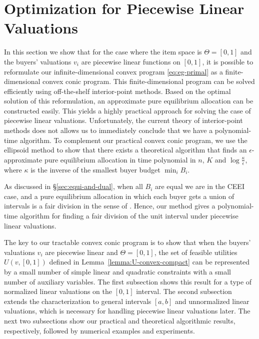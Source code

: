 \section{Optimization for Piecewise Linear Valuations} \label{sec:convex-opt-for-pwl}
In this section we show that for the case where the item space is $\Theta = [0,1]$ and the buyers' valuations $v_i$ are piecewise linear functions on $[0,1]$, it is possible to reformulate our infinite-dimensional convex program \eqref{eq:eg-primal} as a finite-dimensional convex conic program. 
This finite-dimensional program can be solved efficiently using off-the-shelf interior-point methods.
Based on the optimal solution of this reformulation, an approximate pure equilibrium allocation can be constructed easily.
This yields a highly practical approach for solving the case of piecewise linear valuations.
Unfortunately, the current theory of interior-point methods does not allows us to immediately conclude that we have a polynomial-time algorithm.
To complement our practical convex conic program, we use the ellipsoid method to 
show that there exists a theoretical algorithm that finds an $\epsilon$-approximate pure equilibrium allocation in time polynomial in $n$, $K$ and $\log \frac{\kappa}{\epsilon}$, where $\kappa$ is the inverse of the smallest buyer budget $\min_i B_i$.

As discussed in \S\ref{sec:equi-and-dual}, when all $B_i$ are equal we are in the CEEI case, and  a pure equilibrium allocation in which each buyer gets a union of intervals is a fair division in the sense of \citep{weller1985fair}. 
Hence, our method gives a polynomial-time algorithm for finding a fair division of the unit interval under piecewise linear valuations.

The key to our tractable convex conic program is to show that when the buyers' valuations $v_i$ are piecewise linear and $\Theta = [0,1]$, the set of feasible utilities $U(v, [0,1])$ defined in Lemma~\ref{lemma:U-convex-compact} can be represented by a small number of simple linear and quadratic constraints with a small number of auxiliary variables.
The first subsection shows this result for a type of normalized linear valuations on the $[0,1]$ interval. The second subsection extends the characterization to general intervals $[a,b]$ and unnormalized linear valuations, which is necessary for handling piecewise linear valuations later. 
The next two subsections show our practical and theoretical algorithmic results, respectively, followed by numerical examples and experiments.

